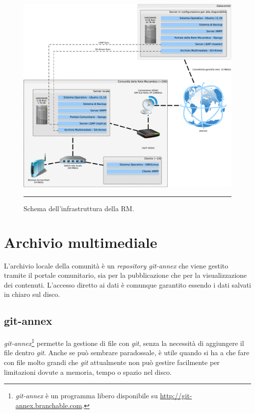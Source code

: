 \begin{figure}[htbp]
  \centering
  \includegraphics[width=\textwidth]{./Figure/SchemaServer_ReteMocambos-crop.pdf}
  \rule{35em}{0.5pt}
  \caption[Schema dell'infrastruttura della RM]{Schema dell'infrastruttura della RM.}
  \label{fig:SchemaServer_ReteMocambos}
\end{figure}

\section{Archivio multimediale}
L'archivio locale della comunità è un \emph{repository git-annex} che
viene gestito tramite il portale comunitario, sia per la pubblicazione
che per la visualizzazione dei contenuti. L'accesso diretto ai dati è
comunque garantito essendo i dati salvati in chiaro sul disco.

\subsection{git-annex}
\emph{git-annex}\footnote{\emph{git-annex} è un programma libero
  disponibile su \url{http://git-annex.branchable.com}.}
permette la gestione di file con \emph{git}, senza la necessità di
aggiungere il file dentro \emph{git}. Anche se può sembrare
paradossale, è utile quando si ha a che fare con file molto grandi che
\emph{git} attualmente non può gestire facilmente per limitazioni
dovute a memoria, tempo o spazio nel disco.

